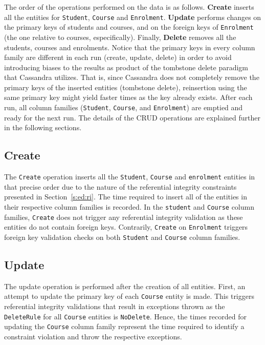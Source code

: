		
The order of the operations performed on the data is as follows. \textbf{Create}
inserts all the entities for \texttt{Student}, \texttt{Course} and
\texttt{Enrolment}. \textbf{Update} performs changes on the primary keys of
students and courses, and on the foreign keys of \texttt{Enrolment} (the one
relative to courses, especifically). Finally, \textbf{Delete} removes all the students,
courses and enrolments.  Notice that the primary keys in every column family 
are different in each run (create, update, delete) in order to avoid 
introducing biases to the results as product of the tombstone delete paradigm 
that Cassandra utilizes. That is, since Cassandra does not completely  remove
the primary keys of the inserted entities (tombstone delete), reinsertion  using
the same primary key might yield faster times as the key already exists. After 
each run, all column families (\texttt{Student}, \texttt{Course}, and
\texttt{Enrolment}) are emptied and ready for the next run.  The details  of the
\ac{CRUD} operations are explained further in the following sections.
		

	
\subsection{Create} The \texttt{Create} operation inserts all the
\texttt{Student}, \texttt{Course} and \texttt{enrolment} entities in that
precise order due to the nature of the referential integrity constraints
presented in Section~\ref{s:ed:ri}. The time required to insert all of the
entities in their respective column families  is recorded. In the
\texttt{student} and \texttt{Course} column families, \texttt{Create} does not
trigger any referential integrity validation as these entities do not contain
foreign keys.
Contrarily, \texttt{Create} on \texttt{Enrolment} triggers foreign key
validation checks on both \texttt{Student} and \texttt{Course} column families.
		
\subsection{Update} The update operation is performed after the creation of all
entities.
First, an attempt to update the primary key of each \texttt{Course} entity is
made. This triggers referential integrity validations that result in exceptions
thrown as the \texttt{DeleteRule} for all \texttt{Course} entities is
\texttt{NoDelete}. Hence, the times recorded for updating the \texttt{Course}
column family represent the time required to identify a constraint violation and throw
the respective exceptions.
					
